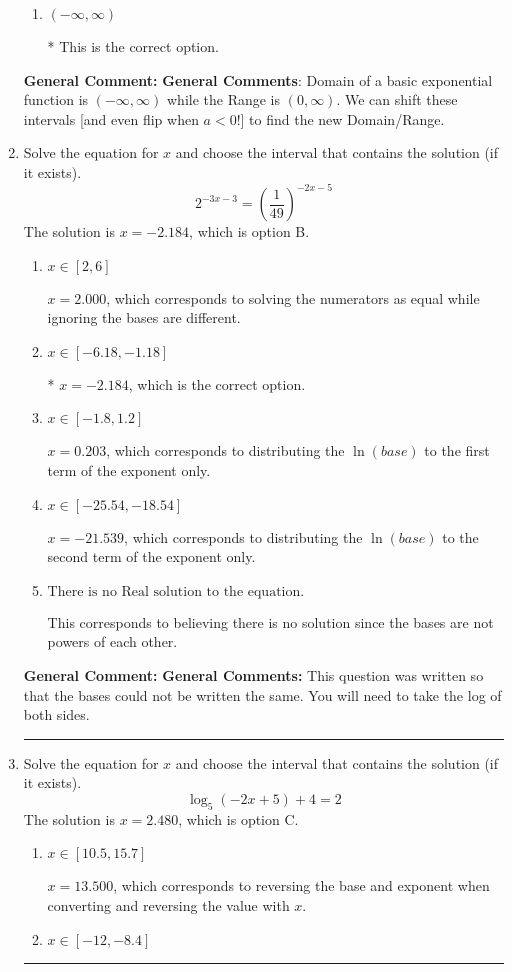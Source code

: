 \documentclass{extbook}[14pt]
\newcommand{\litem}[1]{\item #1

\rule{\textwidth}{0.4pt}}
\begin{document}
\begin{enumerate}
{\begin{enumerate}[label=\Alph*.]
$[-6, \infty)$, which corresponds to using the negative vertical shift AND flipping the Range interval AND including the endpoint.
\item \( (-\infty, \infty) \)

* This is the correct option.
\end{enumerate}

\textbf{General Comment:} \textbf{General Comments}: Domain of a basic exponential function is $(-\infty, \infty)$ while the Range is $(0, \infty)$. We can shift these intervals [and even flip when $a<0$!] to find the new Domain/Range.
}
\litem{
Solve the equation for $x$ and choose the interval that contains the solution (if it exists).
\[ 2^{-3x-3} = \left(\frac{1}{49}\right)^{-2x-5} \]The solution is \( x = -2.184 \), which is option B.\begin{enumerate}[label=\Alph*.]
\item \( x \in [2, 6] \)

$x = 2.000$, which corresponds to solving the numerators as equal while ignoring the bases are different.
\item \( x \in [-6.18, -1.18] \)

* $x = -2.184$, which is the correct option.
\item \( x \in [-1.8, 1.2] \)

$x = 0.203$, which corresponds to distributing the $\ln(base)$ to the first term of the exponent only.
\item \( x \in [-25.54, -18.54] \)

$x = -21.539$, which corresponds to distributing the $\ln(base)$ to the second term of the exponent only.
\item \( \text{There is no Real solution to the equation.} \)

This corresponds to believing there is no solution since the bases are not powers of each other.
\end{enumerate}

\textbf{General Comment:} \textbf{General Comments:} This question was written so that the bases could not be written the same. You will need to take the log of both sides.
}
\litem{
Solve the equation for $x$ and choose the interval that contains the solution (if it exists).
\[ \log_{5}{(-2x+5)}+4 = 2 \]The solution is \( x = 2.480 \), which is option C.\begin{enumerate}[label=\Alph*.]
\item \( x \in [10.5, 15.7] \)

$x = 13.500$, which corresponds to reversing the base and exponent when converting and reversing the value with $x$.
\item \( x \in [-12, -8.4] \)


\end{enumerate}}
\end{enumerate}
\end{document}

